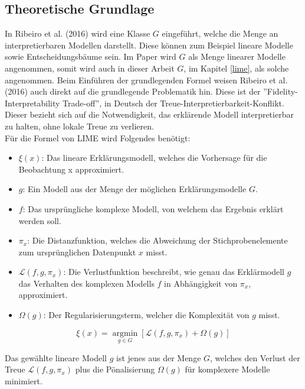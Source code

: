 \documentclass[12pt,titlepage,oneside]{book}
\begin{document}
\subsection{Theoretische Grundlage}
In Ribeiro et al. (2016) wird eine Klasse $G$ eingeführt, welche die Menge an interpretierbaren Modellen darstellt. Diese können zum Beispiel lineare Modelle sowie Entscheidungsbäume sein. Im Paper wird $G$ als Menge linearer Modelle angenommen, somit wird auch in dieser Arbeit $G$, im Kapitel \ref{lime}, als solche angenommen. Beim Einführen der grundlegenden Formel weisen Ribeiro et al. (2016) auch direkt auf die grundlegende Problematik hin. Diese ist der ''Fidelity-Interpretability Trade-off'', in Deutsch der Treue-Interpretierbarkeit-Konflikt. Dieser bezieht sich auf die Notwendigkeit, das erklärende Modell interpretierbar zu halten, ohne lokale Treue zu verlieren.\\
Für die Formel von LIME wird Folgendes benötigt:
\begin{itemize}
    \item $\xi(x)$: Das lineare Erklärungsmodell, welches die Vorhersage für die Beobachtung x approximiert.
    \item $g$: Ein Modell aus der Menge der möglichen Erklärungsmodelle $G$.
    \item $f$: Das ursprüngliche komplexe Modell, von welchem das Ergebnis erklärt werden soll.
    \item $\pi_x$: Die Distanzfunktion, welches die Abweichung der Stichprobenelemente zum ursprünglichen Datenpunkt $x$ misst.
    \item $\mathcal{L}(f, g, \pi_x)$: Die Verlustfunktion beschreibt, wie genau das Erklärmodell $g$ das Verhalten des komplexen Modells $f$ in Abhängigkeit von $\pi_x$, approximiert.
    \item $\Omega(g)$: Der Regularisierungsterm, welcher die Komplexität von $g$ misst.
\end{itemize}

\begin{equation} \label{limeformel}
\xi(x)=\underset{g \in G}{\operatorname{argmin}} \left[ \mathcal{L}\left(f, g, \pi_x\right)+\Omega(g)\right]
\end{equation}

Das gewählte lineare Modell $g$ ist jenes aus der Menge $G$, welches den Verlust der Treue $\mathcal{L}(f, g, \pi_x)$ plus die Pönalisierung $\Omega(g)$ für komplexere Modelle minimiert.

\end{document}
